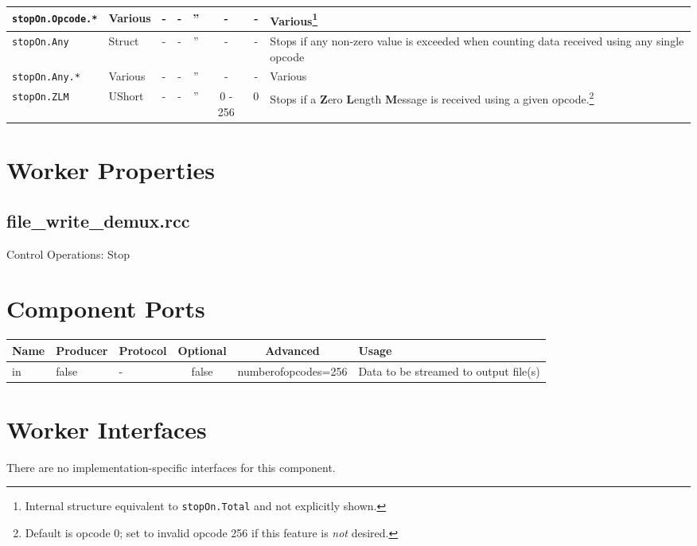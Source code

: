 \documentclass{article}
\def\comp{file\_write\_demux}
\begin{document}
\begin{landscape}
\begin{minipage}{\textwidth}
\begin{scriptsize}
\begin{tabular}{|p{3cm}|p{1.5cm}|c|c|c|c|c|p{7cm}|}
      \hline
      \verb+stopOn.Opcode.*+        & Various   & -              & -               & ''                  & -           & -             & Various\footnote{\label{stopon}Internal structure equivalent to \texttt{stopOn.Total} and not explicitly shown.} \\
      \hline
      \verb+stopOn.Any+             & Struct    & -              & -               & ''                  & -           & -             & Stops if any non-zero value is exceeded when counting data received using any single opcode \\
      \hline
      \verb+stopOn.Any.*+           & Various   & -              & -               & ''                  & -           & -             & Various \\
      \hline
      \verb+stopOn.ZLM+             & UShort    & -              & -               & ''                  & 0 - 256     & 0             & Stops if a \textbf{Z}ero \textbf{L}ength \textbf{M}essage is received using a given opcode.\footnote{Default is opcode 0; set to invalid opcode 256 if this feature is \textit{not} desired.} \\
      \hline
    \end{tabular}
  \end{scriptsize}
  \end{minipage}
  \section*{Worker Properties}
  \subsection*{\comp.rcc}
	Control Operations: Stop

  \section*{Component Ports}
  \begin{scriptsize}
    \begin{tabular}{|M{2cm}|M{1.5cm}|M{4cm}|c|c|M{9cm}|}
      \hline
      Name & Producer & Protocol & Optional & Advanced            & Usage \\
      \hline
			in   & false    & -        & false    & numberofopcodes=256 & Data to be streamed to output file(s) \\
      \hline
    \end{tabular}
  \end{scriptsize}

  \section*{Worker Interfaces}
  There are no implementation-specific interfaces for this component.
\end{landscape}
\end{document}
